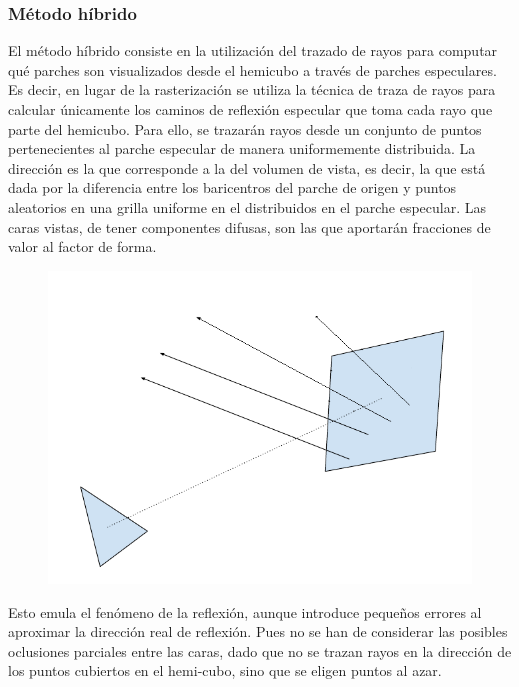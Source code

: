 \subsubsection{Método híbrido}

El método híbrido consiste en la utilización del trazado de rayos para computar qué parches son visualizados desde el hemicubo a través de parches especulares. Es decir, en lugar de la rasterización se utiliza la técnica de traza de rayos para calcular únicamente los caminos de reflexión especular que toma cada rayo que parte del hemicubo. Para ello, se trazarán rayos desde un conjunto de puntos pertenecientes al parche especular de manera uniformemente distribuida. La dirección es la que corresponde a la del volumen de vista, es decir, la que está dada por la diferencia entre los baricentros del parche de origen y puntos aleatorios en una grilla uniforme en el distribuidos en el parche especular. Las caras vistas, de tener componentes difusas, son las que aportarán fracciones de valor al factor de forma.

\begin{figure}[htbp!]
	\centering
	\includegraphics[width=.8\linewidth]{assets/nose}
	\label{img:hibrido}
\end{figure}

Esto emula el fenómeno de la reflexión, aunque introduce pequeños errores al aproximar la dirección real de reflexión. Pues no se han de considerar las posibles oclusiones parciales entre las caras, dado que no se trazan rayos en la dirección de los puntos cubiertos en el hemi-cubo, sino que se eligen puntos al azar.


